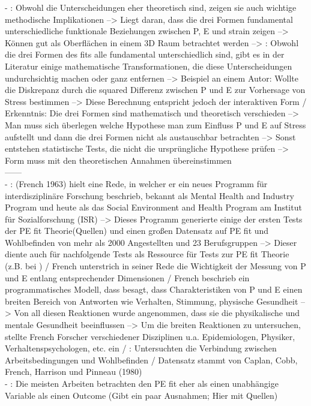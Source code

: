 - \cite[S. 5]{edwards:1990}: Obwohl die Unterscheidungen eher theoretisch sind, zeigen sie auch wichtige methodische Implikationen --> Liegt daran, dass die drei Formen fundamental unterschiedliche funktionale Beziehungen zwischen P, E und strain zeigen --> Können gut als Oberflächen in einem 3D Raum betrachtet werden --> \cite[S. 7]{edwards:1990}: Obwohl die drei Formen des fits alle fundamental unterschiedlich sind, gibt es in der Literatur einige mathematische Transformationen, die diese Unterscheidungen undurchsichtig machen oder ganz entfernen --> Beispiel an einem Autor: Wollte die Diskrepanz durch die squared Differenz zwischen P und E zur Vorhersage von Stress bestimmen --> Diese Berechnung entspricht jedoch der interaktiven Form / Erkenntnis: Die drei Formen sind mathematisch und theoretisch verschieden --> Man muss sich überlegen welche Hypothese man zum Einfluss P und E auf Stress aufstellt und dann die drei Formen nicht als austauschbar betrachten --> Sonst entstehen statistische Tests, die nicht die ursprüngliche Hypothese prüfen --> Form muss mit den theoretischen Annahmen übereinstimmen \\
------\\
- \cite[S. 1f.]{caplan:1993}: (French 1963) hielt eine Rede, in welcher er ein neues Programm für interdisziplinäre Forschung beschrieb, bekannt als Mental Health and Industry Program und heute als das Social Environment and Health Program am Institut für Sozialforschung (ISR) --> Dieses Programm generierte einige der ersten Tests der PE fit Theorie(Quellen) und einen großen Datensatz auf PE fit und Wohlbefinden von mehr als 2000 Angestellten und 23 Berufsgruppen --> Dieser diente auch für nachfolgende Tests als Ressource für Tests zur PE fit Theorie (z.B. bei \textcite{edwards:1993}) / French unterstrich in seiner Rede die Wichtigkeit der Messung von P und E entlang entsprechender Dimensionen / French beschrieb ein programmatisches Modell, dass besagt, dass Charakteristiken von P und E einen breiten Bereich von Antworten wie Verhalten, Stimmung, physische Gesundheit --> Von all diesen Reaktionen wurde angenommen, dass sie die physikalische und mentale Gesundheit beeinflussen --> Um die breiten Reaktionen zu untersuchen, stellte French Forscher verschiedener Disziplinen u.a. Epidemiologen, Physiker, Verhaltenspsychologen, etc. ein / \cite[S. 4]{caplan:1993}: Untersuchten die Verbindung zwischen Arbeitsbedingungen und Wohlbefinden / Datensatz stammt von Caplan,  Cobb,  French,  Harrison und Pinneau (1980) \\- \cite[S. 11]{caplan:1993}: Die meisten Arbeiten betrachten den PE fit eher als einen unabhängige Variable als einen Outcome (Gibt ein paar Ausnahmen; Hier mit Quellen) \\
